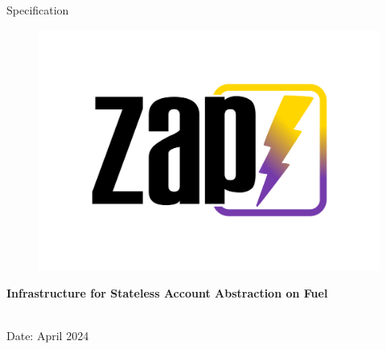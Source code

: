 \documentclass[a4paper, titlepage, 12pt]{article}
\newcommand{\projectTitle}{Infrastructure for Stateless Account Abstraction on Fuel}
\newcommand{\name}{}
\newcommand{\timeFrame}{April 2024}
\newcommand{\docType}{Specification}
\begin{document}
\begin{titlepage}
\begin{center}




\LARGE{ {\docType}}\\[0.7cm]


\begin{figure}[h!]
    \centering
    \includegraphics[width=.4\linewidth]{images/ZapBolt01.png}
\end{figure}
\vspace{1cm}


\Huge{\textbf{\projectTitle}}

\vspace{1cm} 

\Large{\textbf{\name}} \\[3pt]  
\vspace{0.5cm}
\large{Date: \timeFrame} \\

\vspace{1cm}

\end{center}
\end{titlepage}



\newpage

% 
% 
% 
% 
% 

\clearpage

{\small 

}
\end{document}
